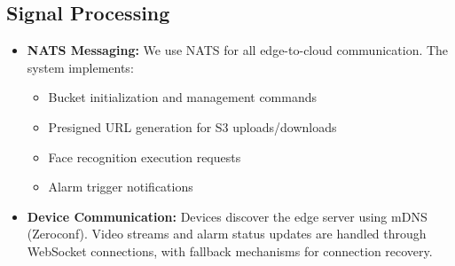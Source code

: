 \documentclass[conference]{IEEEtran}
\begin{document}
\subsection{Signal Processing}
\begin{itemize}
      \item \textbf{NATS Messaging:} We use NATS for all edge-to-cloud communication. The system implements:
            \begin{itemize}
                  \item Bucket initialization and management commands
                  \item Presigned URL generation for S3 uploads/downloads
                  \item Face recognition execution requests
                  \item Alarm trigger notifications
            \end{itemize}
      \item \textbf{Device Communication:} Devices discover the edge server using mDNS (Zeroconf). Video streams and alarm
            status updates are handled through WebSocket connections, with fallback mechanisms for connection recovery.
\end{itemize}
\end{document}
